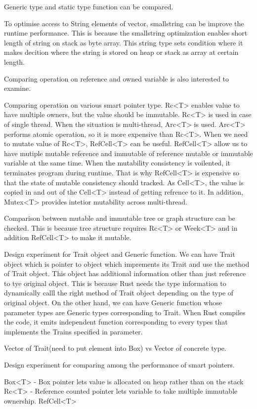 Generic type and static type function can be compared. 

To optimise access to String elements of vector, smallstring can be improve the runtime performance. 
This is because the smallstring optimization enables short length of string on stack as byte array. 
This string type sets condition where it makes decition where the string is stored on heap or stack as array at certain length.

Comparing operation on reference and owned variable is also interested to examine.

Comparing operation on various smart pointer type. 
Rc<T> enables value to have multiple owners, but the value should be immutable. Rc<T> is used in case of single thread. 
When the situation is multi-thread, Arc<T> is used. Arc<T> performs atomic operation, so it is more expensive than Rc<T>. 
When we need to mutate value of Rc<T>, RefCell<T> can be useful. RefCell<T> allow us to have mutiple mutable reference and immutable
of reference mutable or immutable variable at the same time. When the mutability consistency is voilented, it terminates program during runtime. 
That is why RefCell<T> is expensive so that the state of mutable consistency should tracked. 
As Cell<T>, the value is copied in and out of the Cell<T> instead of getting refrence to it. 
In addition, Mutex<T> provides intetior mutability across multi-thread.

Comparison between mutable and immutable tree or graph structure can be checked. 
This is because tree structure requires Rc<T> or Week<T> and in addition RefCell<T> to make it mutable.

Design experiment for Trait object and Generic function. 
We can have Trait object which is pointer to object which imprements its Trait and use the method of Trait object.
This object has additional information other than just reference to tye original object. 
This is because Rust needs the type information to dynamically calll the right method of Trait object depending on the type of 
original object.
On the other hand, we can have Generic function whose parameter types are Generic types corresponding to Trait. 
When Rust compiles the code, it emits independent function corresponding to every types that implements the Trains specified in parameter.


Vector of Trait(need to put element into Box) vs Vector of concrete type.

Design experiment for comparing among the performance of smart pointers.

Box<T> - Box pointer lets value is allocated on heap rather than on the stack
Rc<T> - Reference counted pointer lets variable to take multiple immutable ownership.
RefCell<T>
